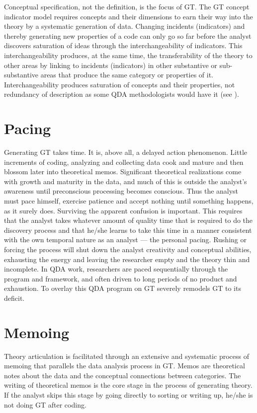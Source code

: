 Conceptual specification, not the definition, is the focus of GT. 
The GT concept indicator model requires concepts and their dimensions to earn their way into the theory by a systematic generation of data. 
Changing incidents (indicators) and thereby generating new properties of a code can only go so far before the analyst discovers saturation of ideas through the interchangeability of indicators.
This interchangeability produces, at the same time, the transferability of the theory to other areas by linking to incidents (indicators) in other substantive or sub-substantive areas that produce the same category or properties of it.
Interchangeability produces saturation of concepts and their properties, not redundancy of description as some QDA methodologists would have it 
(see \citep{article.morse95}).

\section* {Pacing}

Generating GT takes time. 
It is, above all, a delayed action phenomenon. 
Little increments of coding, 
analyzing and collecting data cook and mature and then blossom later into theoretical memos. 
Significant theoretical realizations come with growth and maturity in the data, 
and much of this is outside the analyst’s awareness until preconscious processing becomes conscious. 
Thus the analyst must pace himself, 
exercise patience and accept nothing until something happens,  as it surely does. 
Surviving the apparent confusion is important. 
This requires that the analyst takes whatever amount of quality time that 
is required to do the discovery process and that he/she learns 
to take this time in a manner consistent with the own temporal nature as an analyst --- the personal pacing.
Rushing or forcing the process will shut down the analyst creativity and conceptual abilities, 
exhausting the energy and leaving the researcher empty and the theory thin and incomplete. 
In QDA work, researchers are paced sequentially through the program and framework, 
and often driven to long periods of no product and exhaustion. 
To overlay this QDA program on GT severely remodels GT to its deficit.

\section*{Memoing}

Theory articulation is facilitated through an extensive and systematic process of memoing that parallels the data analysis process in GT. 
Memos are theoretical notes about the data and the conceptual connections between categories. 
The writing of theoretical memos is the core stage in the process of generating theory. 
If the analyst skips this stage by going directly to sorting or writing up, he/she is not doing GT after coding.

